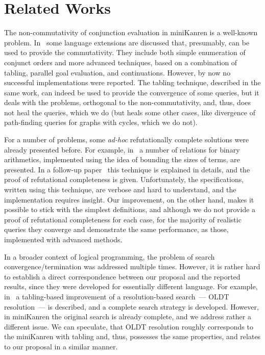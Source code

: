 \section{Related Works}
\label{sec:related_works}

The non-commutativity of conjunction evaluation in miniKanren is a well-known problem. In~\cite{WillThesis} some language
extensions are discussed that, presumably, can be used to provide the commutativity. They include both simple enumeration
of conjunct orders and more advanced techniques, based on a combination of tabling, parallel goal evaluation, and continuations. 
However, by now no successful implementations were reported. The tabling technique, described in the same work, can
indeed be used to provide the convergence of some queries, but it deals with the problems, orthogonal to the non-commutativity,
and, thus, does not heal the queries, which we do (but heals some other cases, like divergence of path-finding queries for
graphs with cycles, which we do not). 

For a number of problems, some \emph{ad-hoc} refutationally complete solutions were already presented before. For example,
in~\cite{TRS} a number of relations for binary arithmetics, implemented using the idea of bounding the sizes of terms, are
presented. In a follow-up paper~\cite{KiselyovArithmetic} this technique is explained in details, and the proof of refutational
completeness is given. Unfortunately, the specifications, written using this technique, are verbose and
hard to understand, and the implementation requires insight. Our improvement, on the other hand, makes it possible to stick
with the simplest definitions, and although we do not provide a proof of refutational completeness for each case, for the
majority of realistic queries they converge and demonstrate the same performance, as those, implemented with advanced methods.

In a broader context of logical programming, the problem of search convergence/termination was addressed multiple
times. However, it is rather hard to establish a direct correspondence between our proposal and the reported results,
since they were developed for essentially different language. For example, in~\cite{OLDresolution} a tabling-based
improvement of a resolution-based search~--- OLDT resolution~--- is described, and a complete search strategy is developed.
However, in miniKanren the original search is already complete, and we address rather a different issue. We can speculate,
that OLDT resolution roughly corresponds to the miniKanren with tabling and, thus, possesses the same properties, and relates to
our proposal in a similar manner.

